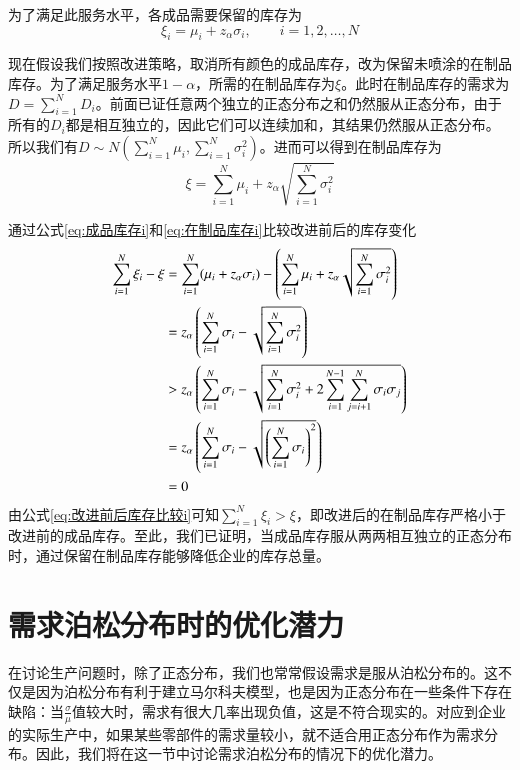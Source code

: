 为了满足此服务水平，各成品需要保留的库存为
\begin{equation}
\xi_i = \mu_i + z_\alpha\sigma_i,\qquad i=1,2,\ldots,N
\label{eq:成品库存i}
\end{equation}

现在假设我们按照改进策略，取消所有颜色的成品库存，改为保留未喷涂的在制品库存。为了满足服务水平$1-\alpha$，所需的在制品库存为$\xi$。此时在制品库存的需求为$D=\sum_{i=1}^ND_i$。前面已证任意两个独立的正态分布之和仍然服从正态分布，由于所有的$D_i$都是相互独立的，因此它们可以连续加和，其结果仍然服从正态分布。所以我们有$D\sim N(\sum_{i=1}^N\mu_i,\sum_{i=1}^N\sigma_i^2)$。进而可以得到在制品库存为
\begin{equation}
\xi = \sum_{i=1}^N\mu_i + z_\alpha\sqrt{\sum_{i=1}^N\sigma_i^2}
\label{eq:在制品库存i}
\end{equation}

通过公式\ref{eq:成品库存i}和\ref{eq:在制品库存i}比较改进前后的库存变化
\begin{align}
\sum_{i=1}^N\xi_i - \xi &= \sum_{i=1}^N (\mu_i+z_\alpha\sigma_i) - \left(\sum_{i=1}^N\mu_i + z_\alpha\sqrt{\sum_{i=1}^N\sigma_i^2}\right) \notag\\
&= z_\alpha\left(\sum_{i=1}^N\sigma_i-\sqrt{\sum_{i=1}^N\sigma_i^2}\right) \notag\\
&> z_\alpha\left(\sum_{i=1}^N\sigma_i-\sqrt{\sum_{i=1}^N\sigma_i^2+2\sum_{i=1}^{N-1}\sum_{j=i+1}^N\sigma_i\sigma_j}\right) \notag\\
&= z_\alpha\left(\sum_{i=1}^N\sigma_i-\sqrt{\left(\sum_{i=1}^N\sigma_i\right)^2}\right) \notag\\
&= 0
\label{eq:改进前后库存比较i}
\end{align}
由公式\ref{eq:改进前后库存比较i}可知$\sum_{i=1}^N\xi_i > \xi$，即改进后的在制品库存严格小于改进前的成品库存。至此，我们已证明，当成品库存服从两两相互独立的正态分布时，通过保留在制品库存能够降低企业的库存总量。









\section{需求泊松分布时的优化潜力}

在讨论生产问题时，除了正态分布，我们也常常假设需求是服从泊松分布的。这不仅是因为泊松分布有利于建立马尔科夫模型，也是因为正态分布在一些条件下存在缺陷：当$\frac{\sigma}{\mu}$值较大时，需求有很大几率出现负值，这是不符合现实的。对应到企业的实际生产中，如果某些零部件的需求量较小，就不适合用正态分布作为需求分布。因此，我们将在这一节中讨论需求泊松分布的情况下的优化潜力。




